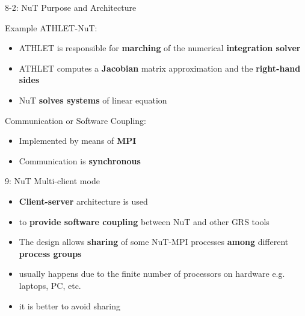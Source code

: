 \ifSpeech
\begin{frame}[t]{8-2: NuT Purpose and Architecture}
    \justifying
    
        Example ATHLET-NuT:
         \begin{itemize}
            \setlength\itemsep{0.25cm}
         
            \item ATHLET is responsible for \textbf{marching} of the numerical \textbf{integration solver}
            
            \item ATHLET computes a \textbf{Jacobian} matrix approximation and the \textbf{right-hand sides}
            
            \item NuT  \textbf{solves systems} of linear equation
        \end{itemize}

        
        \vspace{0.75cm}
        Communication or Software Coupling:
        \begin{itemize}
            \setlength\itemsep{0.25cm}
            \item Implemented by means of \textbf{MPI}
            
            \item Communication is \textbf{synchronous} 
        \end{itemize}

        

\end{frame}



\begin{frame}[t]{9: NuT Multi-client mode}
    \justifying
    
    \begin{itemize}
    
        \setlength\itemsep{0.5cm}
        \item \textbf{Client-server} architecture is used 
        
        \item to \textbf{provide software coupling} between NuT and other GRS tools

        \item  The design allows \textbf{sharing} of some NuT-MPI processes \textbf{among} different \textbf{process groups}
        
        \item usually happens due to the finite number of processors on hardware e.g. laptops, PC, etc.
        
        \item it is better to avoid sharing 
    \end{itemize}
    
    
\end{frame}
\fi



